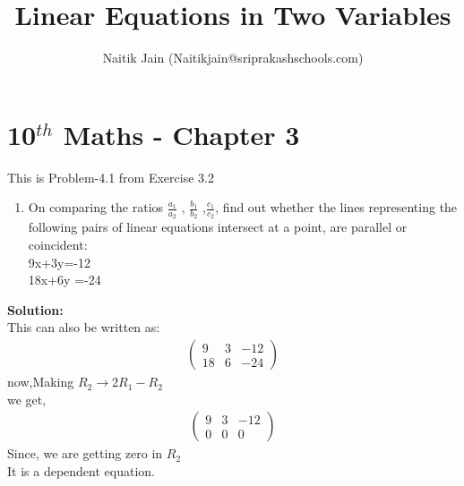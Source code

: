 \documentclass[12pt]{article}
\title{Linear Equations in Two Variables}
\author{Naitik Jain (Naitikjain@sriprakashschools.com)}
\newcommand{\myvec}[1]{\ensuremath{\begin{pmatrix}#1\end{pmatrix}}}
\newcommand{\solution}{\noindent \textbf{Solution: }}
\begin{document}
\maketitle
\section*{10$^{th}$ Maths - Chapter 3}
This is Problem-4.1 from Exercise 3.2
\begin{enumerate}
\item On comparing the ratios $\frac{a_1}{a_2}$ , $\frac{b_1}{b_2}$ ,$\frac{c_1}{c_2}$, find out whether the lines representing the following pairs of linear equations intersect at a point, are parallel or coincident:\\
9x+3y=-12\\ 
18x+6y =-24\\
\end{enumerate}
\solution\\
This can also be written as:
\begin{align}
\myvec{9&3&-12\\18&6&-24}
\end{align}
now,Making $R_2 \xrightarrow\ 2R_1 - R_2$\\ 
we get,
\begin{align}
\myvec{9&3&-12\\0&0&0}
\end{align}
Since, we are getting zero in $R_2$\\
It is a dependent equation.
\end{document}
